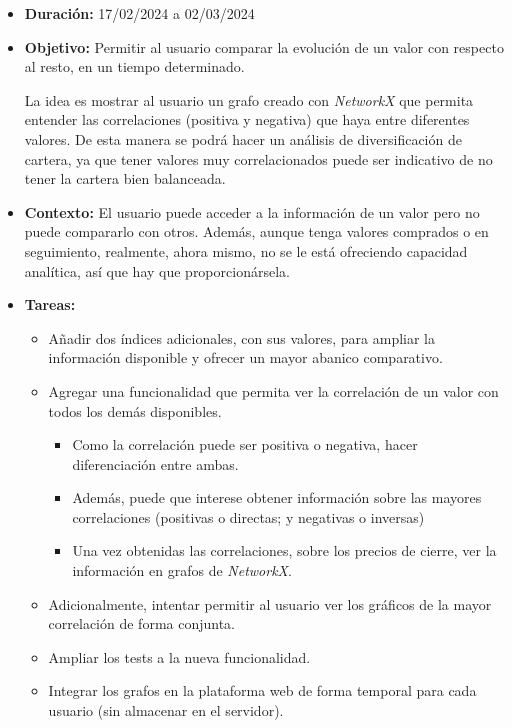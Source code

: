 \begin{itemize}
\item  
\textbf{Duración:} 17/02/2024 a 02/03/2024

\item
\textbf{Objetivo:} Permitir al usuario comparar la evolución de un valor con respecto al resto, en un tiempo determinado. 

La idea es mostrar al usuario un grafo creado con \emph{NetworkX}\citep{online:networkx} que permita entender las correlaciones (positiva y negativa) que haya entre diferentes valores. De esta manera se podrá hacer un análisis de diversificación de cartera, ya que tener valores muy correlacionados puede ser indicativo de no tener la cartera bien balanceada. 

\item
\textbf{Contexto:} El usuario puede acceder a la información de un valor pero no puede compararlo con otros. Además, aunque tenga valores comprados o en seguimiento, realmente, ahora mismo, no se le está ofreciendo capacidad analítica, así que hay que proporcionársela. 


\item
\textbf{Tareas:}
	\begin{itemize}
	\tightlist
	\item 
	Añadir dos índices adicionales, con sus valores, para ampliar la información disponible y ofrecer un mayor abanico comparativo. 
	\item
	Agregar una funcionalidad que permita ver la correlación de un valor con todos los demás disponibles. 
		\begin{itemize}
		\tightlist
		\item 
		Como la correlación puede ser positiva o negativa, hacer diferenciación entre ambas. 
		\item
		Además, puede que interese obtener información sobre las mayores correlaciones (positivas o directas; y negativas o inversas)
		\item
		Una vez obtenidas las correlaciones, sobre los precios de cierre, ver la información en grafos de \emph{NetworkX}. 
		\end{itemize}
	\item
	Adicionalmente, intentar permitir al usuario ver los gráficos de la mayor correlación de forma conjunta. 
	\item
	Ampliar los tests a la nueva funcionalidad. 
	\item
	Integrar los grafos en la plataforma web de forma temporal para cada usuario (sin almacenar en el servidor).
  	\end{itemize}
\end{itemize}

